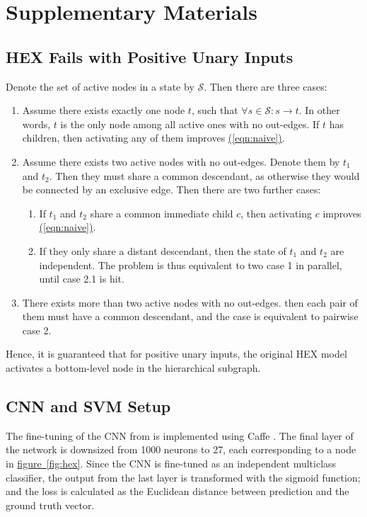 \documentclass[11pt,a4paper]{book}
\begin{document}
\appendix
\chapter{Supplementary Materials}
\label{chap:supplement}
\section{HEX Fails with Positive Unary Inputs}
\label{sec:fail}

Denote the set of active nodes in a state by $\mathcal{S}$. Then there are three cases:
\begin{enumerate}
\item Assume there exists exactly one node $t$, such that $\forall s\in\mathcal{S}:s\rightarrow t$. In other words, $t$ is the only node among all active ones with no out-edges. If $t$ has children, then activating any of them improves \hyperref[eqn:naive]{(\ref{eqn:naive})}.
\item Assume there exists two active nodes with no out-edges. Denote them by $t_1$ and $t_2$. Then they must share a common descendant, as otherwise they would be connected by an exclusive edge. Then there are two further cases:
\begin{enumerate}
\item If $t_1$ and $t_2$ share a common immediate child $c$, then activating $c$ improves \hyperref[eqn:naive]{(\ref{eqn:naive})}.
\item If they only share a distant descendant, then the state of $t_1$ and $t_2$ are independent. The problem is thus equivalent to two case 1 in parallel, until case 2.1 is hit.
\end{enumerate}
\item There exists more than two active nodes with no out-edges. then each pair of them must have a common descendant, and the case is equivalent to pairwise case 2.
\end{enumerate}
Hence, it is guaranteed that for positive unary inputs, the original HEX model activates a bottom-level node in the hierarchical subgraph.

\section{CNN and SVM Setup}
\label{sec:setup}

The fine-tuning of the CNN from \cite{krizhevsky2012imagenet} is implemented using Caffe \cite{jia2014caffe}. The final layer of the network is downsized from 1000 neurons to 27, each corresponding to a node in \hyperref[fig:hex]{figure~\ref{fig:hex}}. Since the CNN is fine-tuned as an independent multiclass classifier, the output from the last layer is transformed with the sigmoid function; and the loss is calculated as the Euclidean distance between prediction and the ground truth vector.
\end{document}

